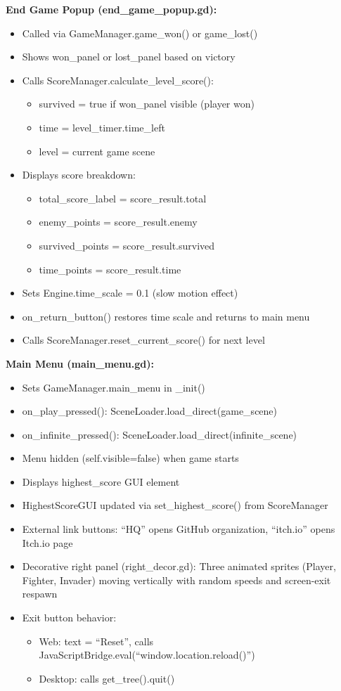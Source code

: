 \documentclass{article}
\begin{document}
\textbf{End Game Popup (end\_game\_popup.gd):}
\begin{itemize}
    \item Called via GameManager.game\_won() or game\_lost()
    \item Shows won\_panel or lost\_panel based on victory
    \item Calls ScoreManager.calculate\_level\_score():
    \begin{itemize}
        \item survived = true if won\_panel visible (player won)
        \item time = level\_timer.time\_left
        \item level = current game scene
    \end{itemize}
    \item Displays score breakdown:
    \begin{itemize}
        \item total\_score\_label = score\_result.total
        \item enemy\_points = score\_result.enemy
        \item survived\_points = score\_result.survived
        \item time\_points = score\_result.time
    \end{itemize}
    \item Sets Engine.time\_scale = 0.1 (slow motion effect)
    \item on\_return\_button() restores time scale and returns to main menu
    \item Calls ScoreManager.reset\_current\_score() for next level
\end{itemize}

\textbf{Main Menu (main\_menu.gd):}
\begin{itemize}
    \item Sets GameManager.main\_menu in \_init()
    \item on\_play\_pressed(): SceneLoader.load\_direct(game\_scene)
    \item on\_infinite\_pressed(): SceneLoader.load\_direct(infinite\_scene)
    \item Menu hidden (self.visible=false) when game starts
    \item Displays highest\_score GUI element
    \item HighestScoreGUI updated via set\_highest\_score() from ScoreManager
    \item External link buttons: ``HQ'' opens GitHub organization, ``itch.io'' opens Itch.io page
    \item Decorative right panel (right\_decor.gd): Three animated sprites (Player, Fighter, Invader) moving vertically with random speeds and screen-exit respawn
    \item Exit button behavior:
    \begin{itemize}
        \item Web: text = ``Reset'', calls JavaScriptBridge.eval(``window.location.reload()'')
        \item Desktop: calls get\_tree().quit()
    \end{itemize}
\end{itemize}
\end{document}
